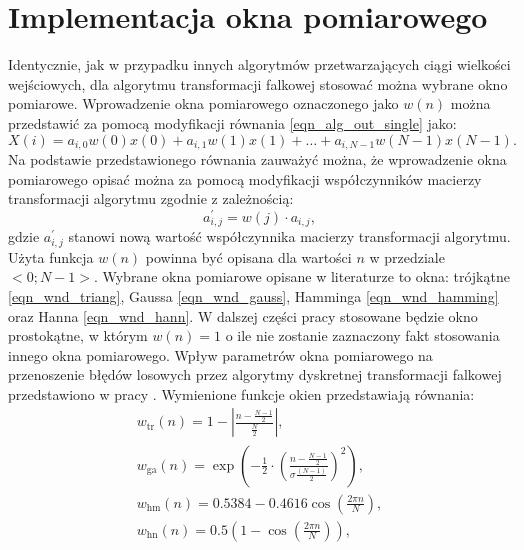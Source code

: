 \section{Implementacja okna pomiarowego}

Identycznie, jak w przypadku innych algorytmów przetwarzających ciągi wielkości wejściowych, dla algorytmu transformacji falkowej stosować można wybrane okno pomiarowe. Wprowadzenie okna pomiarowego oznaczonego jako $w(n)$ można przedstawić za pomocą modyfikacji równania \eqref{eqn_alg_out_single} jako:
\begin{equation}
X \left( i \right) = a_{i, 0} w \left( 0 \right) x \left( 0 \right) + a_{i, 1} w \left( 1 \right) x \left( 1 \right) + \hdots + a_{i, N-1} w \left( N-1 \right) x \left( N-1 \right) \label{eqn_wt_singlewindow}.
\end{equation}
Na podstawie przedstawionego równania zauważyć można, że wprowadzenie okna pomiarowego opisać można za pomocą modyfikacji współczynników macierzy transformacji algorytmu zgodnie z zależnością:
\begin{equation}
a_{i,j}^{'} = w \left( j \right) \cdot a_{i,j} \label{eqn_wt_windowmod},
\end{equation}
gdzie $a_{i,j}^{'}$ stanowi nową wartość współczynnika macierzy transformacji algorytmu. Użyta funkcja $w(n)$ powinna być opisana dla wartości $n$ w przedziale $<0;N-1>$. Wybrane okna pomiarowe opisane w literaturze \cite{oppenheim_dsp} to okna: trójkątne \eqref{eqn_wnd_triang}, Gaussa \eqref{eqn_wnd_gauss}, Hamminga \eqref{eqn_wnd_hamming} oraz Hanna \eqref{eqn_wnd_hann}. W dalszej części pracy stosowane będzie okno prostokątne, w którym $w(n) = 1$ o ile nie zostanie zaznaczony fakt stosowania innego okna pomiarowego. Wpływ parametrów okna pomiarowego na przenoszenie błędów losowych przez algorytmy dyskretnej transformacji falkowej przedstawiono w pracy \cite{auth_window}. Wymienione funkcje okien przedstawiają równania:
\begin{gather}
w_{\text{tr}} \left( n \right) = 1 - \left| \frac{n - \frac{N-1}{2}}{\frac{N}{2}} \right| \label{eqn_wnd_triang}, \\
w_{\text{ga}} \left( n \right) = \exp \left(-\frac{1}{2} \cdot \left( \frac{n - \frac{N-1}{2}}{\sigma \frac{ \left( N-1 \right)}{2}} \right)^2 \right) \label{eqn_wnd_gauss}, \\
w_{\text{hm}} \left( n \right) = 0.5384 - 0.4616 \cos \left( \frac{2 \pi n}{N} \right) \label{eqn_wnd_hamming}, \\
w_{\text{hn}} \left( n \right) = 0.5 \left(1 - \cos \left( \frac{2 \pi n}{N} \right) \right) \label{eqn_wnd_hann},
\end{gather}

